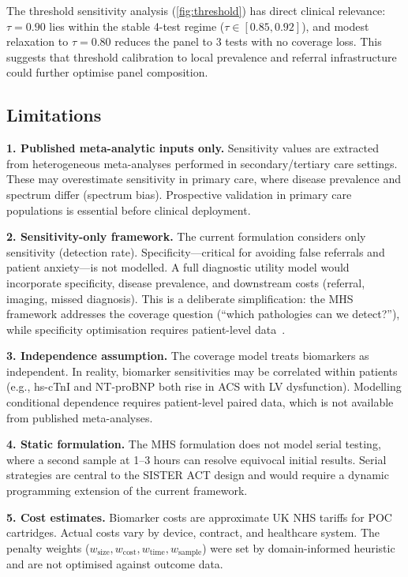 \documentclass[times, twoside, watermark]{zHenriquesLab-StyleBioRxiv}
\begin{document}
The threshold sensitivity analysis (\cref{fig:threshold}) has direct clinical relevance: $\tau = 0.90$ lies within the stable 4-test regime ($\tau \in [0.85, 0.92]$), and modest relaxation to $\tau = 0.80$ reduces the panel to 3 tests with no coverage loss. This suggests that threshold calibration to local prevalence and referral infrastructure could further optimise panel composition.

\subsection*{Limitations}

\textbf{1. Published meta-analytic inputs only.} Sensitivity values are extracted from heterogeneous meta-analyses performed in secondary/tertiary care settings. These may overestimate sensitivity in primary care, where disease prevalence and spectrum differ (spectrum bias). Prospective validation in primary care populations is essential before clinical deployment.

\textbf{2. Sensitivity-only framework.} The current formulation considers only sensitivity (detection rate). Specificity---critical for avoiding false referrals and patient anxiety---is not modelled. A full diagnostic utility model would incorporate specificity, disease prevalence, and downstream costs (referral, imaging, missed diagnosis). This is a deliberate simplification: the MHS framework addresses the coverage question (``which pathologies can we detect?''), while specificity optimisation requires patient-level data~\cite{Lord2006,Moons2015}.

\textbf{3. Independence assumption.} The coverage model treats biomarkers as independent. In reality, biomarker sensitivities may be correlated within patients (e.g., hs-cTnI and NT-proBNP both rise in ACS with LV dysfunction). Modelling conditional dependence requires patient-level paired data, which is not available from published meta-analyses.

\textbf{4. Static formulation.} The MHS formulation does not model serial testing, where a second sample at 1--3 hours can resolve equivocal initial results. Serial strategies are central to the SISTER ACT design and would require a dynamic programming extension of the current framework.

\textbf{5. Cost estimates.} Biomarker costs are approximate UK NHS tariffs for POC cartridges. Actual costs vary by device, contract, and healthcare system. The penalty weights ($w_{\text{size}}, w_{\text{cost}}, w_{\text{time}}, w_{\text{sample}}$) were set by domain-informed heuristic and are not optimised against outcome data.
\end{document}
